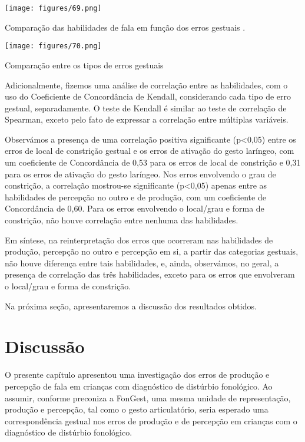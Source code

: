 \documentclass[output=paper,colorlinks,citecolor=brown,booklanguage=portuguese]{langscibook}
\begin{document}
\begin{Figura}
    \texttt{[image: figures/69.png]}

    \caption{{Comparação das habilidades de fala em função dos erros gestuais \citep[97]{Berti2019}.}}
    \label{fig:cap17fig1}
\end{Figura}

\begin{Figura}
    \texttt{[image: figures/70.png]}

    \caption{{Comparação entre os tipos de erros gestuais \citep[97]{Berti2019}}}
    \label{fig:cap17fig2}
\end{Figura}

Adicionalmente, fizemos uma análise de correlação entre as habilidades, com o uso do Coeficiente de Concordância de Kendall, considerando cada tipo de erro gestual, separadamente. O teste de Kendall é similar ao teste de correlação de Spearman, exceto pelo fato de expressar a correlação entre múltiplas variáveis.

Observámos a presença de uma correlação positiva significante (p<0,05) entre os erros de local de constrição gestual e os erros de ativação do gesto laríngeo, com um coeficiente de Concordância de 0,53 para os erros de local de constrição e 0,31 para os erros de ativação do gesto laríngeo. Nos erros envolvendo o grau de constrição, a correlação mostrou-se significante (p<0,05) apenas entre as habilidades de percepção no outro e de produção, com um coeficiente de Concordância de 0,60. Para os erros envolvendo o local/grau e forma de constrição, não houve correlação entre nenhuma das habilidades.

Em síntese, na reinterpretação dos erros que ocorreram nas habilidades de produção, percepção no outro e percepção em si, a partir das categorias gestuais, não houve diferença entre tais habilidades, e, ainda, observámos, no geral, a presença de correlação das três habilidades, exceto para os erros que envolveram o local/grau e forma de constrição.

Na próxima seção, apresentaremos a discussão dos resultados obtidos.

\section{Discussão}
O presente capítulo apresentou uma investigação dos erros de produção e percepção de fala em crianças com diagnóstico de distúrbio fonológico. Ao assumir, conforme preconiza a FonGest, uma mesma unidade de representação, produção e percepção, tal como o gesto articulatório, seria esperado uma correspondência gestual nos erros de produção e de percepção em crianças com o diagnóstico de distúrbio fonológico.
\end{document}
